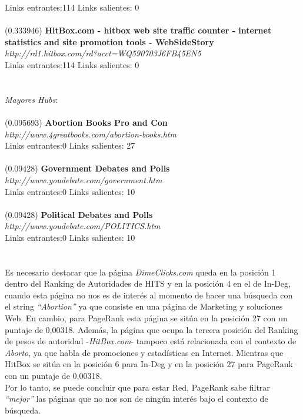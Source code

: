 \documentclass[a4paper]{article}
\begin{document}
Links entrantes:114 \indent Links salientes: 0\\
\\
(0.333946) \textbf{HitBox.com - hitbox web site traffic counter - internet statistics and site promotion tools - WebSideStory} \\
\textit{http://rd1.hitbox.com/rd?acct=WQ590703J6FB45EN5} \\
Links entrantes:114 \indent Links salientes: 0\\
\\
\\
\emph{Mayores Hubs}: \\
\\
(0.095693)\textbf{ Abortion Books Pro and Con} \\
\textit{http://www.4greatbooks.com/abortion-books.htm} \\
Links entrantes:0 \indent Links salientes: 27\\
\\
(0.09428) \textbf{Government Debates and Polls} \\
\textit{http://www.youdebate.com/government.htm }\\
Links entrantes:0 \indent Links salientes: 10\\
\\
(0.09428) \textbf{Political Debates and Polls }\\
\textit{http://www.youdebate.com/POLITICS.htm} \\
Links entrantes:0 \indent Links salientes: 10\\
\\
\\
\indent Es necesario destacar que  la p\'agina \emph{DimeClicks.com} queda en la posici\'on 1 dentro del Ranking de Autoridades de HITS y en la posici\'on 4 en el de In-Deg, cuando esta p\'agina no nos es de inter\'es al momento de hacer una b\'usqueda con el string \textit{``Abortion''} ya que consiste en una p\'agina de Marketing y soluciones Web. En cambio, para PageRank esta p\'agina se sit\'ua en la posici\'on 27 con un puntaje de 0,00318. Adem\'as, la p\'agina que ocupa la tercera posici\'on del Ranking de pesos de autoridad -\emph{HitBox.com}- tampoco est\'a relacionada con el contexto de \emph{Aborto}, ya que habla de promociones y estad\'isticas en Internet. Mientras que HitBox se sit\'ua en la posici\'on 6 para In-Deg y en la posici\'on 27 para PageRank con un puntaje de 0,00318. \\
\indent Por lo tanto, se puede concluir que para estar Red, PageRank sabe filtrar \textit{``mejor''} las p\'aginas que no nos son de ning\'un inter\'es bajo el contexto de b\'usqueda.\\
\end{document}
